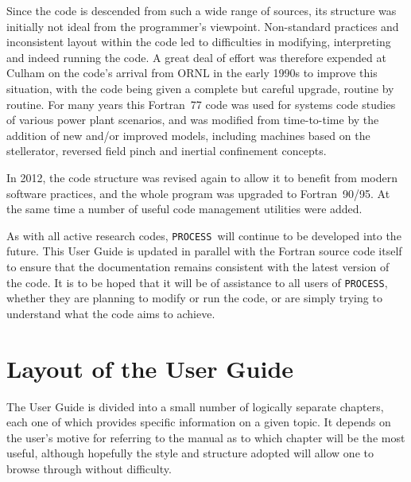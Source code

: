 \documentclass[11pt,a4paper]{report}
\newcommand{\process}{\mbox{\texttt{PROCESS}}}
\begin{document}
Since the code is descended from such a wide range of sources, its structure
was initially not ideal from the programmer's viewpoint.  Non-standard
practices and inconsistent layout within the code led to difficulties in
modifying, interpreting and indeed running the code. A great deal of effort
was therefore expended at Culham on the code's arrival from ORNL in the early
1990s to improve this situation, with the code being given a complete but
careful upgrade, routine by routine. For many years this Fortran~77 code was
used for systems code studies of various power plant scenarios, and was
modified from time-to-time by the addition of new and/or improved models,
including machines based on the stellerator, reversed field pinch and inertial
confinement concepts.

In 2012, the code structure was revised again to allow it to benefit from
modern software practices, and the whole program was upgraded to
Fortran~90/95. At the same time a number of useful code management utilities
were added.

As with all active research codes, \process\ will continue to be developed
into the future. This User Guide is updated in parallel with the Fortran
source code itself to ensure that the documentation remains consistent with
the latest version of the code. It is to be hoped that it will be of
assistance to all users of \process, whether they are planning to modify or
run the code, or are simply trying to understand what the code aims to
achieve.

\section{Layout of the User Guide}

The User Guide is divided into a small number of logically separate chapters,
each one of which provides specific information on a given topic. It depends
on the user's motive for referring to the manual as to which chapter will be
the most useful, although hopefully the style and structure adopted will allow
one to browse through without difficulty.
\end{document}
